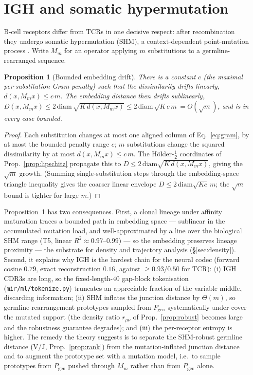 \documentclass[11pt]{article}
\theoremstyle{oldplain}
\newtheorem{proposition}{Proposition}
\theoremstyle{oldrem}
\newcommand{\Pgen}{P_{\mathrm{gen}}}
\newcommand{\code}[1]{\texttt{#1}}
\begin{document}
\section{{\normalfont\scshape IGH} and somatic hypermutation}\label{sec:igh}

B-cell receptors differ from {\scshape TCR}s in one decisive respect: after recombination they undergo
somatic hypermutation ({\scshape SHM}), a context-dependent point-mutation process \cite{Yaari2013}.
Write $M_m$ for an operator applying $m$ substitutions to a germline-rearranged sequence.

\begin{proposition}[Bounded embedding drift]\label{prop:drift}
There is a constant $c$ (the maximal per-substitution Gram penalty) such that the \emph{dissimilarity}
drifts linearly, $d(x,M_m x)\le c\,m$. The \emph{embedding distance} then drifts \emph{sub}linearly,
$D(x,M_m x) \le 2\,\mathrm{diam}\,\sqrt{K\,d(x,M_m x)} \le 2\,\mathrm{diam}\,\sqrt{K\,c\,m}
= O(\sqrt m)$, and is in every case bounded.
\end{proposition}
\begin{proof}
Each substitution changes at most one aligned column of Eq.~\eqref{eq:gram}, by at most the bounded
penalty range $c$; $m$ substitutions change the squared dissimilarity by at most $d(x,M_m x)\le c\,m$. The
H\"older-$\tfrac12$ coordinates of Prop.~\ref{prop:lipschitz} propagate this to
$D\le 2\,\mathrm{diam}\sqrt{K\,d(x,M_m x)}$, giving the $\sqrt m$ growth. (Summing single-substitution steps
through the embedding-space triangle inequality gives the coarser linear envelope $D\le
2\,\mathrm{diam}\sqrt{Kc}\,m$; the $\sqrt m$ bound is tighter for large $m$.)
\end{proof}

Proposition~\ref{prop:drift} has two consequences. First, a clonal lineage under affinity maturation
traces a bounded path in embedding space --- sublinear in the accumulated mutation load, and
well-approximated by a line over the biological {\scshape SHM} range (T5, linear $R^2\approx0.97$--$0.99$)
--- so the embedding preserves lineage proximity --- the substrate for density and trajectory analysis
(\S\ref{sec:density}). Second, it explains why {\scshape IGH} is the hardest chain for the neural codec
(forward cosine $0.79$, exact reconstruction $0.16$, against $\ge0.93$/$0.50$ for {\scshape
TCR}): (i) {\scshape IGH} CDR3s are long, so the fixed-length-40 gap-block tokenisation
(\code{mir/ml/tokenize.py}) truncates an appreciable fraction of the variable middle, discarding
information; (ii) {\scshape SHM} inflates the junction distance by $\Theta(m)$, so germline-rearrangement
prototypes sampled from $\Pgen$ systematically under-cover the mutated support (the density ratio $r_{\mu\nu}$
of Prop.~\ref{prop:robust} becomes large and the robustness guarantee degrades); and (iii) the
per-receptor entropy is higher. The remedy the theory suggests is to separate the {\scshape SHM}-robust
germline distance (V/J, Prop.~\ref{prop:rank}) from the mutation-inflated junction distance and to
augment the prototype set with a mutation model, i.e.\ to sample prototypes from $\Pgen$ pushed through
$M_m$ rather than from $\Pgen$ alone.
\end{document}
